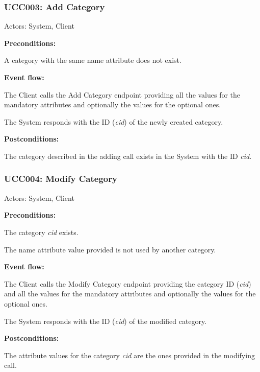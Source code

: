 \begin{ucbox}{\subsubsection{UCC003: Add Category}}
\label{UCC003}

Actors: System, Client

\textbf{Preconditions:}

\ucitem A category with the same name attribute does not exist.

\textbf{Event flow:}

\ucitem The Client calls the Add Category endpoint providing all the values for the mandatory attributes and optionally the values for the optional ones.

\ucitem The System responds with the ID (\textit{cid}) of the newly created category.

\textbf{Postconditions:}

\ucitem The category described in the adding call exists in the System with the ID \textit{cid}.

\end{ucbox}

\begin{ucbox}{\subsubsection{UCC004: Modify Category}}
\label{UCC004}

Actors: System, Client

\textbf{Preconditions:}

\ucitem The category \textit{cid} exists.

\ucitem The name attribute value provided is not used by another category.

\textbf{Event flow:}

\ucitem The Client calls the Modify Category endpoint providing the category ID (\textit{cid}) and all the values for the mandatory attributes and optionally the values for the optional ones.

\ucitem The System responds with the ID (\textit{cid}) of the modified category.

\textbf{Postconditions:}

\ucitem The attribute values for the category \textit{cid} are the ones provided in the modifying call.

\end{ucbox}

